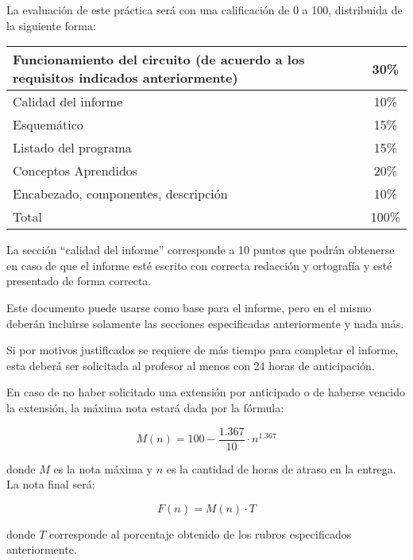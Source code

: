 \documentclass[12pt,letterpaper]{IEEEtran}
\begin{document}
La evaluación de este práctica será con una calificación de 0 a 100, distribuida de la siguiente forma:

\begin{center}
 \begin{tabular}{p{}|c}\hline
   Funcionamiento del circuito (de acuerdo a los requisitos indicados anteriormente) 					     & 30\% \\\hline
   Calidad del informe	  				& 10\% \\\hline
   Esquemático							& 15\% \\\hline
   Listado del programa					& 15\% \\\hline
   Conceptos Aprendidos					& 20\% \\\hline
   Encabezado, componentes, descripción & 10\% \\\hline\hline
   Total								& 100\% \\
 \end{tabular}
\end{center}

La sección ``calidad del informe'' corresponde a 10 puntos que podrán obtenerse en caso de que el informe esté escrito con correcta redacción y ortografía y esté presentado de forma correcta.

Este documento puede usarse como base para el informe, pero en el mismo deberán incluirse solamente las secciones especificadas anteriormente y nada más.

Si por motivos justificados se requiere de más tiempo para completar el informe, esta deberá ser solicitada al profesor al menos con 24 horas de anticipación.

En caso de no haber solicitado una extensión por anticipado o de haberse vencido la extensión, la máxima nota estará dada por la fórmula:

\[ M(n) = 100-\frac{1.367}{10}\cdot n^{1.367} \]

donde $M$ es la nota máxima y $n$ es la cantidad de horas de atraso en la entrega. La nota final será:

\[ F(n) = M(n)\cdot T \]

donde $T$ corresponde al porcentaje obtenido de los rubros especificados anteriormente.
\end{document}
